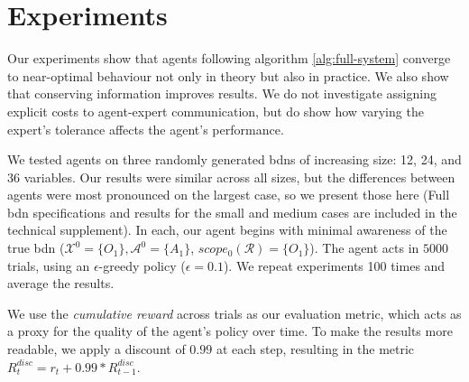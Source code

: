 \documentclass{article}
\newcommand{\bdn}{{\sc bdn}}
\begin{document}
	\section{Experiments}
	\label{sec:experiments}
	
	Our experiments show that agents following algorithm \ref{alg:full-system} converge to near-optimal behaviour not only in theory but also in practice. We also show that conserving information improves results. We do not investigate assigning explicit costs to agent-expert communication, but do show how varying the expert's tolerance affects the agent's performance.
	
	We tested agents on three randomly generated \bdn{}s of increasing size: 12, 24, and 36 variables. Our results were similar across all sizes, but the differences between agents were most pronounced on the largest case, so we present those here (Full \bdn{} specifications and results for the small and medium cases are included in the technical supplement). In each, our agent begins with minimal awareness of the true \bdn{} ($\mathcal{X}^0 = \{ O_1 \}, \mathcal{A}^0 = \{A_1\}$, $scope_0(\mathcal{R}) = \{ O_1 \}$). The agent acts in $5000$ trials, using an $\epsilon$-greedy policy ($\epsilon = 0.1$). We repeat experiments 100 times and average the results.
		
	We use the \emph{cumulative reward} across trials as our evaluation metric, which acts as a proxy for the quality of the agent's policy over time. To make the results more readable, we apply a discount of $0.99$ at each step, resulting in the metric $R^{disc}_t = r_t + 0.99 * R^{disc}_{t-1}$.
	
\end{document}
